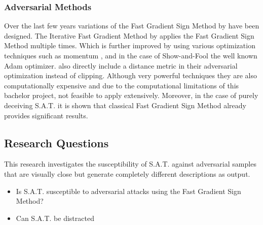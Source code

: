\subsubsection*{Adversarial Methods}
Over the last few years variations of the Fast Gradient Sign Method by \cite{goodfellow2015explaining} have been designed. The Iterative Fast Gradient Method by \citeauthor{Kurakin} applies the Fast Gradient Sign Method multiple times. Which is further improved by using various optimization techniques such as momentum \cite{9237700}, and in the case of Show-and-Fool the well known Adam\cite{kingma2017adam} optimizer. \citeauthor{EvaluatingRobustness} also directly include a distance metric in their adversarial optimization instead of clipping. Although very powerful techniques they are also computationally expensive and due to the computational limitations of this bachelor project, not feasible to apply extensively. Moreover, in the case of purely deceiving S.A.T. it is shown that classical Fast Gradient Sign Method already provides significant results.

\subsection{Research Questions}
This research investigates the susceptibility of S.A.T. against adversarial samples that are visually close but generate completely different descriptions as output.
\begin{itemize}
    \item Is S.A.T. susceptible to adversarial attacks using the Fast Gradient Sign Method?
    \item Can S.A.T. be distracted 
\end{itemize}
